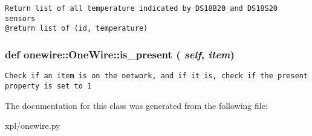 \footnotesize\begin{verbatim}
Return list of all temperature indicated by DS18B20 and DS18S20 sensors
@return list of (id, temperature)
\end{verbatim}
\normalsize
 \hypertarget{classonewire_1_1OneWire_a39fa5e62e0d65e62a915eb334d54fed}{
\subsubsection[is\_\-present]{\setlength{\rightskip}{0pt plus 5cm}def onewire::OneWire::is\_\-present ( {\em self}, \/   {\em item})}}
\label{classonewire_1_1OneWire_a39fa5e62e0d65e62a915eb334d54fed}




\footnotesize\begin{verbatim}
Check if an item is on the network, and if it is, check if the present property is set to 1
\end{verbatim}
\normalsize
 

The documentation for this class was generated from the following file:\begin{CompactItemize}
\item 
xpl/onewire.py\end{CompactItemize}
